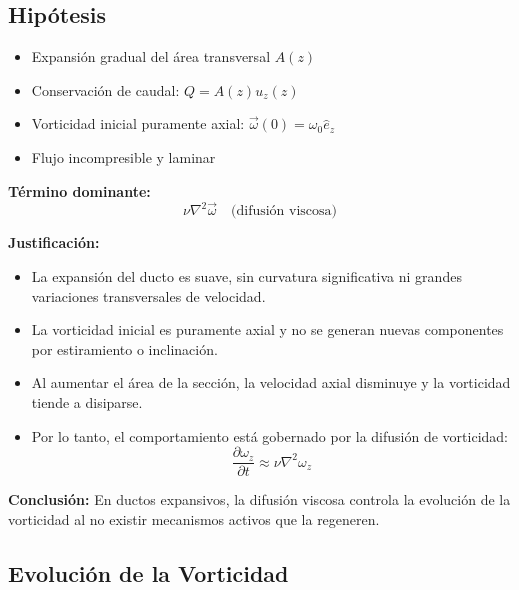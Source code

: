 \documentclass{article}
\begin{document}
\subsection{Hipótesis}

\begin{center}
    \end{center}

\begin{itemize}
    \item Expansión gradual del área transversal $A(z)$
    \item Conservación de caudal: $Q = A(z)u_z(z)$
    \item Vorticidad inicial puramente axial: $\vec{\omega}(0) = \omega_0 \hat{e}_z$
    \item Flujo incompresible y laminar
\end{itemize}

\textbf{Término dominante:}
\[
\nu \nabla^2 \vec{\omega} \quad \text{(difusión viscosa)}
\]

\textbf{Justificación:}
\begin{itemize}
    \item La expansión del ducto es suave, sin curvatura significativa ni grandes variaciones transversales de velocidad.
    \item La vorticidad inicial es puramente axial y no se generan nuevas componentes por estiramiento o inclinación.
    \item Al aumentar el área de la sección, la velocidad axial disminuye y la vorticidad tiende a disiparse.
    \item Por lo tanto, el comportamiento está gobernado por la difusión de vorticidad:
    \[
    \frac{\partial \omega_z}{\partial t} \approx \nu \nabla^2 \omega_z
    \]
\end{itemize}

\textbf{Conclusión:} En ductos expansivos, la difusión viscosa controla la evolución de la vorticidad al no existir mecanismos activos que la regeneren.


\subsection{Evolución de la Vorticidad}
\end{document}
